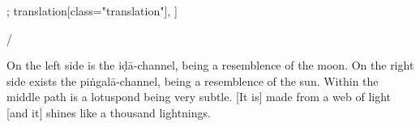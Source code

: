 \documentclass[12pt]{article}%
\def\om{\textrm{\foreignlanguage{english}{\footnotesize omitted in\ }}} %
\begin{document}
\begin{alignment}[
    texts=edition[class="edition"];
    translation[class="translation"],
  ]
\begin{edition}
\begin{prose}
{          }/
      \end{prose}
    \end{edition}
    \begin{translation}
      \begin{tlate}On the left side is the iḍā-channel, being a resemblence of the moon. On the right side exists the piṅgalā-channel, being a resemblence of the sun. Within the middle path is a lotuspond being very subtle. [It is] made from a web of light [and it] shines like a thousand lightnings. \end{tlate}
    \end{translation}
    \begin{edition}
      \begin{prose}
\end{prose}
\end{edition}
\end{alignment}
\end{document}
